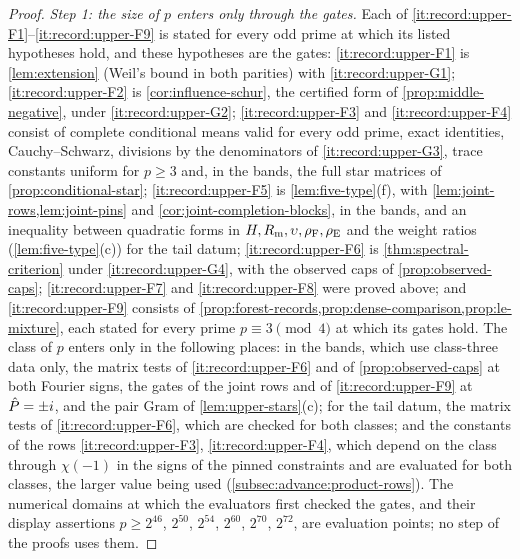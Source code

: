 \begin{proof}
\emph{Step 1: the size of $p$ enters only through the gates.} Each of
\ref{it:record:upper-F1}--\ref{it:record:upper-F9} is stated for every odd
prime at which its listed hypotheses hold, and these hypotheses are the gates:
\ref{it:record:upper-F1} is \cref{lem:extension} (Weil's bound in both
parities) with \ref{it:record:upper-G1}; \ref{it:record:upper-F2} is
\cref{cor:influence-schur}, the certified form of \cref{prop:middle-negative},
under \ref{it:record:upper-G2};
\ref{it:record:upper-F3} and \ref{it:record:upper-F4} consist of complete
conditional means valid for every odd prime, exact identities, Cauchy--Schwarz,
divisions by the denominators of \ref{it:record:upper-G3}, trace constants uniform
for $p\ge3$ and, in the bands, the full star matrices of
\cref{prop:conditional-star}; \ref{it:record:upper-F5} is \cref{lem:five-type}(f),
with \cref{lem:joint-rows,lem:joint-pins} and \cref{cor:joint-completion-blocks}, in
the bands, and an inequality between quadratic forms in
$H,R_{\rm m},\upsilon,\rho_{\rm F},\rho_{\rm E}$ and the weight ratios
(\cref{lem:five-type}(c)) for the tail datum; \ref{it:record:upper-F6} is
\cref{thm:spectral-criterion} under \ref{it:record:upper-G4}, with the observed caps
of \cref{prop:observed-caps}; \ref{it:record:upper-F7} and \ref{it:record:upper-F8}
were proved above; and \ref{it:record:upper-F9} consists of
\cref{prop:forest-records,prop:dense-comparison,prop:le-mixture}, each stated for
every prime $p\equiv3\pmod4$ at which its gates hold. The class of $p$ enters only
in the following places: in the bands, which use class-three data only, the matrix
tests of \ref{it:record:upper-F6} and of \cref{prop:observed-caps} at both Fourier
signs, the gates of the joint rows and of \ref{it:record:upper-F9} at $\hat P=\pm i$,
and the pair Gram of \cref{lem:upper-stars}(c); for the tail datum, the matrix tests
of \ref{it:record:upper-F6}, which are checked for both classes; and the constants
of the rows \ref{it:record:upper-F3}, \ref{it:record:upper-F4}, which depend on the
class through $\chi(-1)$ in the signs of the pinned constraints and are evaluated
for both classes, the larger value being used (\cref{subsec:advance:product-rows}).
The numerical domains at which the evaluators first checked the gates, and their
display assertions $p\ge2^{46}$, $2^{50}$, $2^{54}$, $2^{60}$, $2^{70}$, $2^{72}$,
are evaluation points; no step of the proofs uses them.


\end{proof}
